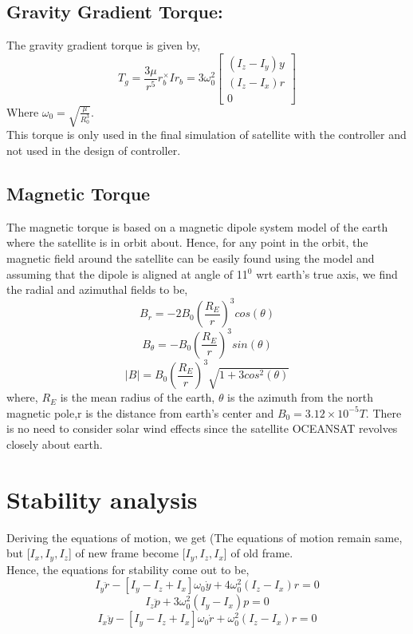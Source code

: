 \documentclass[10pt,a4paper]{report}
\begin{document}
\section{Gravity Gradient Torque:}
The gravity gradient torque is given by,
	\begin{equation}
	T_{g}=\frac{3\mu}{r^{5}}r_{b}^{\times}Ir_{b}=3\omega_{0}^{2}\begin{bmatrix}
	(I_{z}-I_{y})y\\(I_{z}-I_{x})r \\0
	\end{bmatrix}
	\end{equation}
	Where $ \omega_{0} =\sqrt{\frac{\mu}{R_{0}^{3}}}$.\\
This torque is only used in the final simulation of satellite with the controller and not used in the design of controller.
\section{Magnetic Torque}
The magnetic torque is based on a magnetic dipole system model of the earth where the satellite is in orbit about. Hence, for any point in the orbit, the magnetic field around the satellite can be easily found using the model and assuming that the dipole is aligned at angle of 11$ ^{0} $ wrt earth's true axis, we find the radial and azimuthal fields to be,
\begin{equation}
B_{r}=-2B_{0}\left(\frac{R_{E}}{r}\right)^{3}cos(\theta)
\end{equation}
\begin{equation}
B_{\theta}=-B_{0}\left(\frac{R_{E}}{r}\right)^{3}sin(\theta)
\end{equation}
\begin{equation}
|B|=B_{0}\left(\frac{R_{E}}{r}\right)^{3}\sqrt{1+3cos^{2}(\theta)}
\end{equation}
where, $ R_{E} $ is the mean radius of the earth, $ \theta $ is the azimuth from the north magnetic pole,r is the distance from earth's center and $B_{0}=3.12\times10^{-5}T$. There is no need to consider solar wind effects since the satellite OCEANSAT revolves closely about earth.
\chapter{Stability analysis}
Deriving the equations of motion, we get (The equations of motion remain same, but [$I_{x},I_{y},I_{z}$] of new frame become [$I_{y},I_{z},I_{x}$] of old frame.\\
Hence, the equations for stability come out to be,
\begin{equation}
I_{y}\ddot{r}-[I_{y}-I_{z}+I_{x}]\omega_{0}\dot{y}+4\omega_{0}^{2}(I_{z}-I_{x})r=0
\end{equation}
\begin{equation}
I_{z}\ddot{p}+3\omega_{0}^{2}(I_{y}-I_{x})p=0
\end{equation}
\begin{equation}
I_{x}\ddot{y}-[I_{y}-I_{z}+I_{x}]\omega_{0}\dot{r}+\omega_{0}^{2}(I_{z}-I_{x})r=0
\end{equation}
\end{document}
